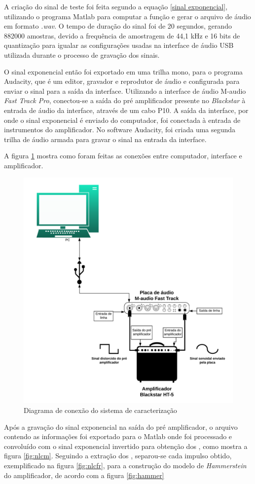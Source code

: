 A criação do sinal de teste foi feita segundo a equação \ref{sinal exponencial}, utilizando o programa Matlab para computar a função e gerar o arquivo de áudio em formato \textit{.wav}. O tempo de duração do sinal foi de 20 segundos, gerando 882000 amostras, devido a frequência de amostragem de 44,1 kHz e 16 bits de quantização para igualar as configurações usadas na interface de áudio USB utilizada durante o processo de gravação dos sinais.


O sinal exponencial então foi exportado em uma trilha mono, para o programa Audacity, que é um editor, gravador e reprodutor de áudio e configurada para enviar o sinal para a saída da interface. Utilizando a interface de áudio M-audio \textit{Fast Track Pro}, conectou-se a saída do pré amplificador presente no \textit{Blackstar} à entrada de áudio da interface, através de um cabo P10. A saída da interface, por onde o sinal exponencial é enviado do computador, foi conectada à entrada de instrumentos do amplificador. No software Audacity, foi criada uma segunda trilha de áudio armada para gravar o sinal na entrada da interface. 


A figura \ref{fig:diag} mostra como foram feitas as conexões entre computador, interface e amplificador.
\begin{figure}
	\centering
	\includegraphics[width=0.7\linewidth]{figuras/diag}
	\caption{Diagrama de conexão do sistema de caracterização}
	\label{fig:diag}
\end{figure}

Após a gravação do sinal exponencial na saída do pré amplificador, o arquivo contendo as informações foi exportado para o Matlab onde foi processado e convoluído com o sinal exponencial invertido para obtenção dos , como mostra a figura \ref{fig:nlcm}. Seguindo a extração dos , separou-se cada impulso obtido, exemplificado na figura \ref{fig:nlcfr}, para a construção do modelo de \textit{Hammerstein} do amplificador, de acordo com a figura \ref{fig:hammer}


